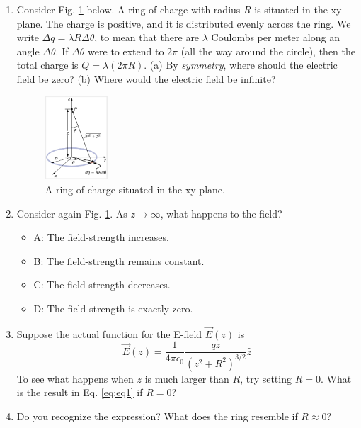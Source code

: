 \documentclass{article}
\begin{document}
\begin{enumerate}
\item Consider Fig. \ref{fig:ring} below.  A ring of charge with radius $R$ is situated in the xy-plane.  The charge is positive, and it is distributed evenly across the ring.  We write $\Delta q = \lambda R \Delta\theta$, to mean that there are $\lambda$ Coulombs per meter along an angle $\Delta \theta$.  If $\Delta\theta$ were to extend to $2\pi$ (all the way around the circle), then the total charge is $Q = \lambda (2 \pi R)$.  (a) By \textit{symmetry}, where should the electric field be zero?  (b) Where would the electric field be infinite?
\begin{figure}[ht]
\centering
\includegraphics[width=0.22\textwidth]{figures/ring.png}
\caption{\label{fig:ring} A ring of charge situated in the xy-plane.}
\end{figure}
\item Consider again Fig. \ref{fig:ring}.  As $z \rightarrow \infty$, what happens to the field?
\begin{itemize}
\item A: The field-strength increases.
\item B: The field-strength remains constant.
\item C: The field-strength decreases.
\item D: The field-strength is exactly zero.
\end{itemize}
\item Suppose the actual function for the E-field $\vec{E}(z)$ is
\begin{equation}
\vec{E}(z) = \frac{1}{4\pi \epsilon_0} \frac{q z}{\left( z^2 + R^2 \right)^{3/2}} \hat{z} \label{eq:eq1}
\end{equation}
To see what happens when $z$ is much larger than $R$, try setting $R=0$.  What is the result in Eq. \ref{eq:eq1} if $R=0$? \\ \vspace{1cm}
\item Do you recognize the expression?  What does the ring resemble if $R \approx 0$?
\end{enumerate}
\end{document}
